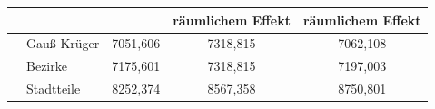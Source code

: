 \documentclass{Vorlage}
\begin{document}
\begin{table}[h]
\begin{tabular}{llccc}
                          & \multicolumn{1}{l|}{}             & \multicolumn{1}{c|}{}                                     & \multicolumn{1}{c|}{räumlichem Effekt} & räumlichem Effekt \\ \hline
                          & \multicolumn{1}{l|}{Gauß-Krüger} & \multicolumn{1}{c|}{7051,606}                             & \multicolumn{1}{c|}{7318,815}          & 7062,108          \\
                          & \multicolumn{1}{l|}{Bezirke}      & \multicolumn{1}{c|}{7175,601}                             & \multicolumn{1}{c|}{7318,815}          & 7197,003          \\
                          & \multicolumn{1}{l|}{Stadtteile}   & \multicolumn{1}{c|}{8252,374}                             & \multicolumn{1}{c|}{8567,358}          & 8750,801          \\ \hline \hline
\end{tabular}
\end{table}
\end{document}
